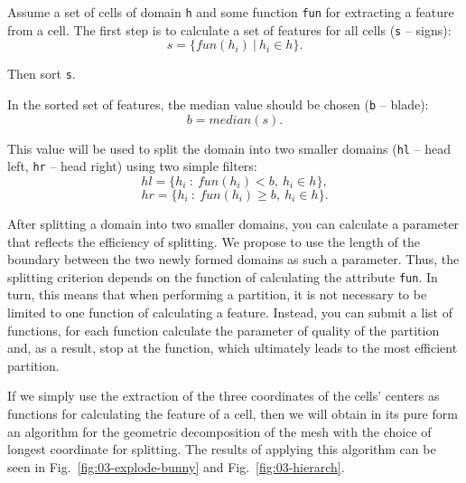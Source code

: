 \documentclass[
11pt,%
tightenlines,%
twoside,%
onecolumn,%
nofloats,%
nobibnotes,%
nofootinbib,%
superscriptaddress,%
noshowpacs,%
centertags]%
{revtex4}
\begin{document}
Assume a set of cells of domain \texttt{h} and some function \texttt{fun} for extracting a feature from a cell.
The first step is to calculate a set of features for all cells (\texttt{s} -- signs):
\begin{equation*}
	s = \{fun(h_i)~|~h_i \in h\}.
\end{equation*}

Then sort \texttt{s}.

In the sorted set of features, the median value should be chosen (\texttt{b} -- blade):
\begin{equation*}
	b = median(s).
\end{equation*}

This value will be used to split the domain into two smaller domains (\texttt{hl} -- head left, \texttt{hr} -- head right) using two simple filters:
\begin{equation*}
	hl = \{h_i~:~fun(h_i) < b,~h_i \in h\},
\end{equation*}
\begin{equation*}
	hr = \{h_i~:~fun(h_i) \geq b,~h_i \in h\}.
\end{equation*}

After splitting a domain into two smaller domains, you can calculate a parameter that reflects the efficiency of splitting.
We propose to use the length of the boundary between the two newly formed domains as such a parameter.
Thus, the splitting criterion depends on the function of calculating the attribute \texttt{fun}.
In turn, this means that when performing a partition, it is not necessary to be limited to one function of calculating a feature.
Instead, you can submit a list of functions, for each function calculate the parameter of quality of the partition and, as a result, stop at the function, which ultimately leads to the most efficient partition.

If we simply use the extraction of the three coordinates of the cells' centers as functions for calculating the feature of a cell, then we will obtain in its pure form an algorithm for the geometric decomposition of the mesh with the choice of longest coordinate for splitting.
The results of applying this algorithm can be seen in Fig.~\ref{fig:03-explode-bunny} and Fig.~\ref{fig:03-hierarch}.
\end{document}

